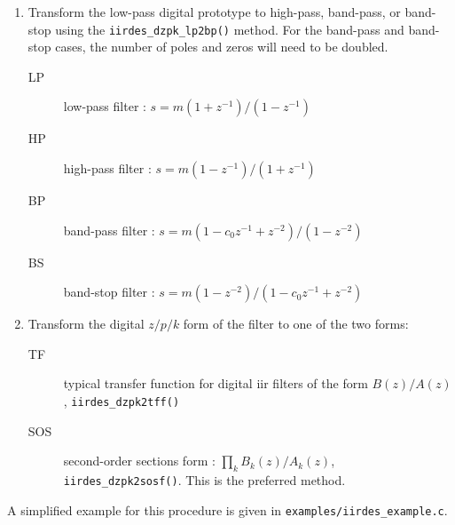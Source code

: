 \begin{enumerate}
\item Transform the low-pass digital prototype to high-pass, band-pass, or
      band-stop using the {\tt iirdes\_dzpk\_lp2bp()} method.
      For the band-pass and band-stop cases, the number of poles and zeros
      will need to be doubled.
    \begin{description}
    \item[LP] low-pass filter   : $s = m (1+z^{-1}) / (1-z^{-1})$
    \item[HP] high-pass filter  : $s = m (1-z^{-1}) / (1+z^{-1})$
    \item[BP] band-pass filter  : $s = m (1-c_0 z^{-1}+z^{-2}) / (1-z^{-2})$
    \item[BS] band-stop filter  : $s = m (1-z^{-2}) / (1-c_0 z^{-1}+z^{-2})$
    \end{description}

\item Transform the digital $z/p/k$ form of the filter to one of the two forms:
    \begin{description}
    \item[TF]  typical transfer function for digital iir filters of the form
        $B(z)/A(z)$, {\tt iirdes\_dzpk2tff()}
    \item[SOS] second-order sections form : $\prod_k{ B_k(z)/A_k(z) }$, 
        {\tt iirdes\_dzpk2sosf()}.
        This is the preferred method.
    \end{description}


\end{enumerate}
%
A simplified example for this procedure is given in
{\tt examples/iirdes\_example.c}.

